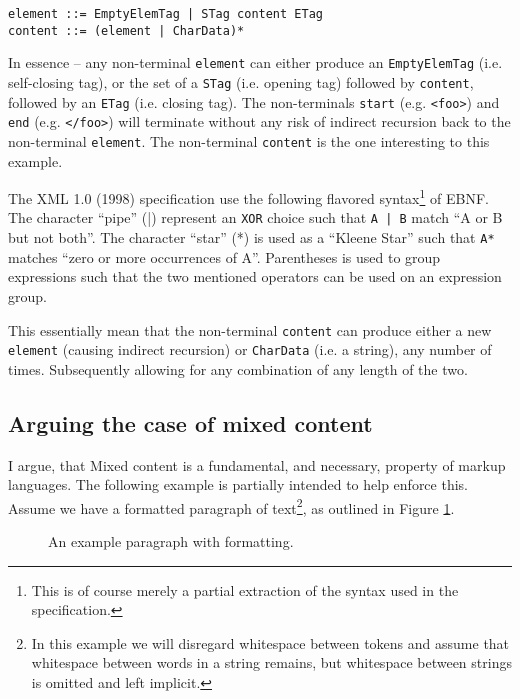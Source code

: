 \documentclass{scrreprt}
\begin{document}
\begin{lstlisting}
element ::= EmptyElemTag | STag content ETag 
content ::= (element | CharData)*
\end{lstlisting}

In essence -- any non-terminal \texttt{element} can either produce an \texttt{EmptyElemTag} (i.e. self-closing tag), or the set of a \texttt{STag} (i.e. opening tag) followed by \texttt{content}, followed by an \texttt{ETag} (i.e. closing tag). The non-terminals \texttt{start} (e.g. \texttt{<foo>}) and \texttt{end} (e.g. \texttt{</foo>}) will terminate without any risk of indirect recursion back to the non-terminal \texttt{element}. The non-terminal \texttt{content} is the one interesting to this example.

The XML 1.0 (1998) specification use the following flavored syntax\footnote{This is of course merely a partial extraction of the syntax used in the specification.} of EBNF. The character ``pipe'' (|) represent an \texttt{XOR} choice such that \texttt{A | B} match ``A or B but not both''. The character ``star'' (*) is used as a ``Kleene Star'' such that \texttt{A*} matches ``zero or more occurrences of A''. Parentheses is used to group expressions such that the two mentioned operators can be used on an expression group.

This essentially mean that the non-terminal \texttt{content} can produce either a new \texttt{element} (causing indirect recursion) or \texttt{CharData} (i.e. a string), any number of times. Subsequently allowing for any combination of any length of the two.



\subsection{Arguing the case of mixed content}
I argue, that Mixed content is a fundamental, and necessary, property of markup languages. The following example is partially intended to help enforce this. Assume we have a formatted paragraph of text\footnote{In this example we will disregard whitespace between tokens and assume that whitespace between words in a string remains, but whitespace between strings is omitted and left implicit.}, as outlined in Figure \ref{fig:mixed-content-paragraph}.


\begin{figure}[h]
\centering
{}
\caption{An example paragraph with formatting.}
\label{fig:mixed-content-paragraph}
\end{figure}
\end{document}
